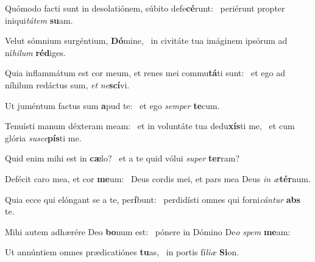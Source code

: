 \item Quómodo facti sunt in desolatiónem, súbito defe\textbf{cé}runt:~\psstar{} periérunt propter iniqui\textit{tátem} \textbf{su}am.
\item Velut sómnium surgéntium, \textbf{Dó}mine,~\psstar{} in civitáte tua imáginem ipsórum ad ní\textit{hilum} \textbf{réd}iges.
\item Quia inflammátum est cor meum, et renes mei commu\textbf{tá}ti sunt:~\psstar{} et ego ad níhilum redáctus sum, \textit{et} \textit{ne}\textbf{scí}vi.
\item Ut juméntum factus sum \textbf{a}pud te:~\psstar{} et ego \textit{semper} \textbf{te}cum.
\item Tenuísti manum déxteram meam:~\pscross{} et in voluntáte tua dedu\textbf{xís}ti me,~\psstar{} et cum glória \textit{susce}\textbf{pís}ti me.
\item Quid enim mihi est in \textbf{cæ}lo?~\psstar{} et a te quid vólui \textit{super} \textbf{ter}ram?
\item Defécit caro mea, et cor \textbf{me}um:~\psstar{} Deus cordis mei, et pars mea Deus \textit{in} \textit{æ}\textbf{tér}num.
\item Quia ecce qui elóngant se a te, per\textbf{í}bunt:~\psstar{} perdidísti omnes qui forni\textit{cántur} \textbf{abs} te.
\item Mihi autem adhærére Deo \textbf{bo}num est:~\psstar{} pónere in Dómino De\textit{o} \textit{spem} \textbf{me}am:
\item Ut annúntiem omnes prædicatiónes \textbf{tu}as,~\psstar{} in portis fí\textit{liæ} \textbf{Si}on.
